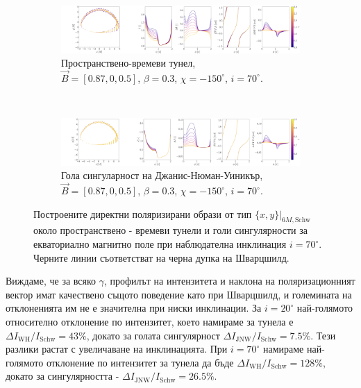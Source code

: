 \documentclass[12pt]{article}
\numberwithin{equation}{section}
\numberwithin{figure}{section}
\begin{document}
		
	\begin{figure}[!htb]
		\begin{subfigure}{16cm}
			\hspace{-1.0em}
			\includegraphics[scale = 0.15]{Section_7_Polarized_Emission/WH_delta_fig_B_0.87_0.5_0_70_deg_r6.png}
			\caption{Пространствено-времеви тунел,\\ $\vec{B} = [0.87, 0, 0.5]$, $\beta = 0.3$, $\chi = -150^\circ$, $i = 70^\circ$.} 
		\end{subfigure}\\
		\begin{subfigure}{17cm}
			\hspace{-1em}
			\includegraphics[scale = 0.15]{Section_7_Polarized_Emission/JNW_delta_figs_B_0.87_0.0_0.5_70_deg_direct.png}
			\caption{Гола сингуларност на Джанис-Нюман-Уиникър,\\  $\vec{B} = [0.87, 0, 0.5]$, $\beta = 0.3$, $\chi = -150^\circ$, $i = 70^\circ$.}
		\end{subfigure}
		\caption[Поляризирани директни образи около пространствено - времеви тунели и голи сингулярности за екваториално магнитно поле при $i = 70^\circ$.]{\small Построените директни поляризирани образи от тип $\{x,y\}\vert_{6M, \text{Schw}}$ около пространствено - времеви тунели  и голи сингулярности за екваториално магнитно поле при наблюдателна инклинация $i = 70^\circ$. Черните линии съответстват на черна дупка на Шварцшилд.} 
		\label{Direct_image_deltas_70}
	\end{figure}
	\newpage
	Виждаме, че за всяко $\gamma$, профилът на интензитета и наклона на поляризационният вектор имат качествено същото поведение като при Шварцшилд, и големината на отклоненията им не е значителна при ниски инклинации. За $i = 20^\circ$ най-голямото относително отклонение по интензитет, което намираме за тунела е $\Delta I_\text{WH} / I_{\text{Schw}} = 43\%$, докато за голата сингулярност $\Delta I_\text{JNW} / I_{\text{Schw}} = 7.5\%$. Тези разлики растат с увеличаване на инклинацията. При $i = 70^\circ$ намираме най-голямото отклонение по интензитет за тунела да бъде $\Delta I_{\text{WH}} / I_{\text{Schw}} = 128\%$, докато за сингулярността - $\Delta I_{\text{JNW}} / I_{\text{Schw}} = 26.5\%$.\\
	
\end{document}
